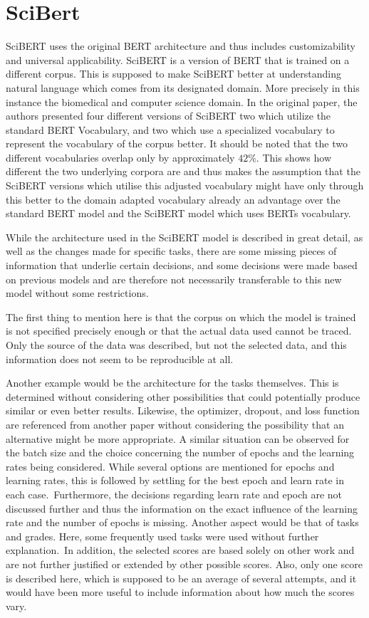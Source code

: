 \chapter{SciBert}
SciBERT uses the original BERT architecture and thus includes customizability and universal applicability. SciBERT is a version of BERT that is trained on a different corpus. This is supposed to make SciBERT better at understanding natural language which comes from its designated domain. More precisely in this instance the biomedical and computer science domain. In the original paper, the authors presented four different versions of SciBERT two which utilize the standard BERT Vocabulary, and two which use a specialized vocabulary to represent the vocabulary of the corpus better. It should be noted that the two different vocabularies overlap only by approximately $42\%$. This shows how different the two underlying corpora are and thus makes the assumption that the SciBERT versions which utilise this adjusted vocabulary might have only through this better to the domain adapted vocabulary already an advantage over the standard BERT model and the SciBERT model which uses BERTs vocabulary.

\color{red}
While the architecture used in the SciBERT model is described in great detail, as well as the changes made for specific tasks, there are some missing pieces of information that underlie certain decisions, and some decisions were made based on previous models and are therefore not necessarily transferable to this new model without some restrictions.

The first thing to mention here is that the corpus on which the model is trained is not specified precisely enough or that the actual data used cannot be traced.  Only the source of the data was described, but not the selected data, and this information does not seem to be reproducible at all.

Another example would be the architecture for the tasks themselves. This is determined without considering other possibilities that could potentially produce similar or even better results. Likewise, the optimizer, dropout, and loss function are referenced from another paper without considering the possibility that an alternative might be more appropriate. A similar situation can be observed for the batch size and the choice concerning the number of epochs and the learning rates being considered. While several options are mentioned for epochs and learning rates, this is followed by settling for the best epoch and learn rate in each case. Furthermore, the decisions regarding learn rate and epoch are not discussed further and thus the information on the exact influence of the learning rate and the number of epochs is missing.
Another aspect would be that of tasks and grades. Here, some frequently used tasks were used without further explanation. In addition, the selected scores are based solely on other work and are not further justified or extended by other possible scores. Also, only one score is described here, which is supposed to be an average of several attempts, and it would have been more useful to include information about how much the scores vary.  
\color{black}



